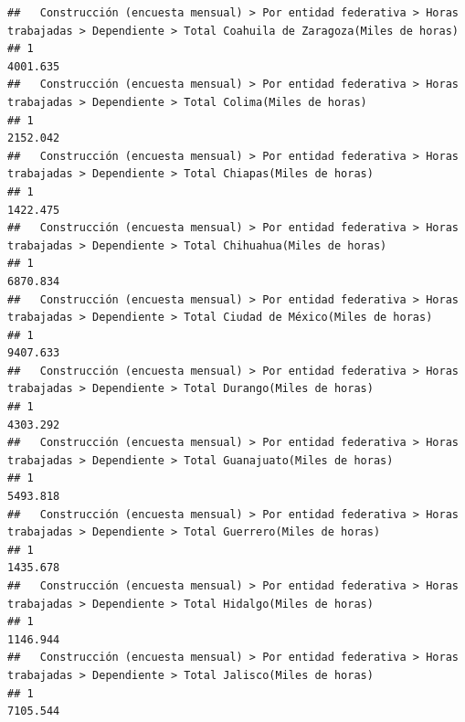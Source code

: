 \documentclass[
]{article}
\begin{document}
\begin{verbatim}
##   Construcción (encuesta mensual) > Por entidad federativa > Horas trabajadas > Dependiente > Total Coahuila de Zaragoza(Miles de horas) 
## 1                                                                                                                                4001.635
##   Construcción (encuesta mensual) > Por entidad federativa > Horas trabajadas > Dependiente > Total Colima(Miles de horas) 
## 1                                                                                                                  2152.042
##   Construcción (encuesta mensual) > Por entidad federativa > Horas trabajadas > Dependiente > Total Chiapas(Miles de horas) 
## 1                                                                                                                   1422.475
##   Construcción (encuesta mensual) > Por entidad federativa > Horas trabajadas > Dependiente > Total Chihuahua(Miles de horas) 
## 1                                                                                                                     6870.834
##   Construcción (encuesta mensual) > Por entidad federativa > Horas trabajadas > Dependiente > Total Ciudad de México(Miles de horas) 
## 1                                                                                                                            9407.633
##   Construcción (encuesta mensual) > Por entidad federativa > Horas trabajadas > Dependiente > Total Durango(Miles de horas) 
## 1                                                                                                                   4303.292
##   Construcción (encuesta mensual) > Por entidad federativa > Horas trabajadas > Dependiente > Total Guanajuato(Miles de horas) 
## 1                                                                                                                      5493.818
##   Construcción (encuesta mensual) > Por entidad federativa > Horas trabajadas > Dependiente > Total Guerrero(Miles de horas) 
## 1                                                                                                                    1435.678
##   Construcción (encuesta mensual) > Por entidad federativa > Horas trabajadas > Dependiente > Total Hidalgo(Miles de horas) 
## 1                                                                                                                   1146.944
##   Construcción (encuesta mensual) > Por entidad federativa > Horas trabajadas > Dependiente > Total Jalisco(Miles de horas) 
## 1                                                                                                                   7105.544

\end{verbatim}
\end{document}
